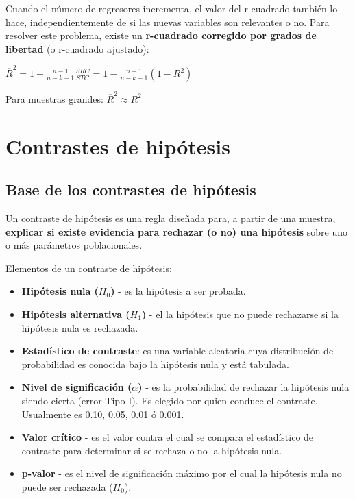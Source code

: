 \documentclass[10pt, a4paper, landscape]{extarticle}
\begin{document}
\begin{multicols}{3}
Cuando el número de regresores incrementa, el valor del r-cuadrado también lo hace, independientemente de si las nuevas variables son relevantes o no. Para resolver este problema, existe un \textbf{r-cuadrado corregido por grados de libertad} (o r-cuadrado ajustado):

\begin{center}
$\overline{R}^2 = 1 - \frac{n-1}{n-k-1} \frac{SRC}{STC} = 1 - \frac{n-1}{n-k-1} (1-R^2)$
\end{center}

Para muestras grandes: $\overline{R}^2 \approx R^2$

\section*{Contrastes de hipótesis}
\subsection*{Base de los contrastes de hipótesis}

Un contraste de hipótesis es una regla diseñada para, a partir de una muestra, \textbf{explicar si existe evidencia para rechazar (o no) una hipótesis} sobre uno o más parámetros poblacionales.

Elementos de un contraste de hipótesis:

\begin{itemize}[leftmargin=*]
\item \textbf{Hipótesis nula ($H_0$)} - es la hipótesis a ser probada.
\item \textbf{Hipótesis alternativa ($H_1$)} - el la hipótesis que no puede rechazarse si la hipótesis nula es rechazada.
\item \textbf{Estadístico de contraste}: es una variable aleatoria cuya distribución de probabilidad es conocida bajo la hipótesis nula y está tabulada.
\item \textbf{Nivel de significación ($\alpha$)} - es la probabilidad de rechazar la hipótesis nula siendo cierta (error Tipo I). Es elegido por quien conduce el contraste. Usualmente es 0.10, 0.05, 0.01 ó 0.001.
\item \textbf{Valor crítico} - es el valor contra el cual se compara el estadístico de contraste para determinar si se rechaza o no la hipótesis nula.
\item \textbf{p-valor} - es el nivel de significación máximo por el cual la hipótesis nula no puede ser rechazada ($H_0$).
\end{itemize}


\end{multicols}
\end{document}
